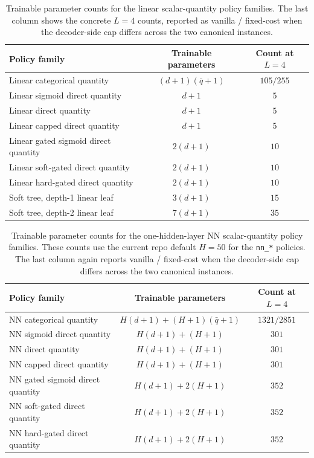 \documentclass[11pt]{article}
\begin{document}
\begin{table}[t]
\centering
\small
\caption{Trainable parameter counts for the linear scalar-quantity policy families. The last
column shows the concrete $L=4$ counts, reported as vanilla / fixed-cost when the decoder-side
cap differs across the two canonical instances.}
\label{tab:linear-parameter-counts}
\begin{tabular}{|l|c|c|}
\hline
Policy family & Trainable parameters & Count at $L=4$ \\
\hline
Linear categorical quantity & $(d+1)(\bar q+1)$ & $105 / 255$ \\
Linear sigmoid direct quantity & $d+1$ & $5$ \\
Linear direct quantity & $d+1$ & $5$ \\
Linear capped direct quantity & $d+1$ & $5$ \\
Linear gated sigmoid direct quantity & $2(d+1)$ & $10$ \\
Linear soft-gated direct quantity & $2(d+1)$ & $10$ \\
Linear hard-gated direct quantity & $2(d+1)$ & $10$ \\
Soft tree, depth-1 linear leaf & $3(d+1)$ & $15$ \\
Soft tree, depth-2 linear leaf & $7(d+1)$ & $35$ \\
\hline
\end{tabular}
\end{table}

\begin{table}[t]
\centering
\small
\caption{Trainable parameter counts for the one-hidden-layer NN scalar-quantity policy families.
These counts use the current repo default $H=50$ for the \texttt{nn\_*} policies. The last column
again reports vanilla / fixed-cost when the decoder-side cap differs across the two canonical
instances.}
\label{tab:nn-parameter-counts}
\begin{tabular}{|l|c|c|}
\hline
Policy family & Trainable parameters & Count at $L=4$ \\
\hline
NN categorical quantity & $H(d+1) + (H+1)(\bar q+1)$ & $1321 / 2851$ \\
NN sigmoid direct quantity & $H(d+1) + (H+1)$ & $301$ \\
NN direct quantity & $H(d+1) + (H+1)$ & $301$ \\
NN capped direct quantity & $H(d+1) + (H+1)$ & $301$ \\
NN gated sigmoid direct quantity & $H(d+1) + 2(H+1)$ & $352$ \\
NN soft-gated direct quantity & $H(d+1) + 2(H+1)$ & $352$ \\
NN hard-gated direct quantity & $H(d+1) + 2(H+1)$ & $352$ \\
\hline
\end{tabular}
\end{table}
\end{document}
